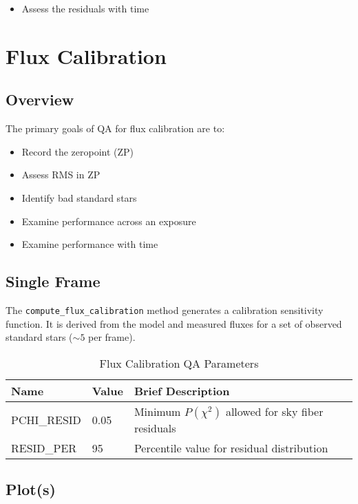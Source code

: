 \documentclass[12pt]{article}
\newenvironment{myitemize}
{ \begin{itemize}
    \setlength{\itemsep}{0pt}
    \setlength{\parskip}{0pt}
    \setlength{\parsep}{0pt}     }
{ \end{itemize}                  }
\begin{document}
\begin{myitemize}
\item Assess the residuals with time
\end{myitemize}

\section{Flux Calibration}

\subsection{Overview}

The primary goals of QA for flux calibration are to:

\begin{myitemize}
\item Record the zeropoint (ZP) 
\item Assess RMS in ZP
\item Identify bad standard stars
\item Examine performance across an exposure
\item Examine performance with time
\end{myitemize}

\subsection{Single Frame}

The {\tt compute\_flux\_calibration} method generates
a calibration sensitivity function.  It is derived
from the model and measured fluxes for
a set of observed standard stars ($\sim 5$ per frame).

\begin{table}[h]
\begin{center}
\caption{Flux Calibration QA Parameters}
\label{tab:flux_param}
\begin{tabular}{p{3.5cm}p{1.2cm}p{8.3cm}}
\hline
{\bf Name} & {\bf Value} & {\bf Brief Description}\\
\hline
PCHI\_RESID    & 0.05 & Minimum $P(\chi^2)$ allowed for sky fiber residuals \\ 
RESID\_PER     & 95   & Percentile value for residual distribution \\
\hline
\end{tabular}
\end{center}
\end{table}


\subsection{Plot(s)}
\end{document}
